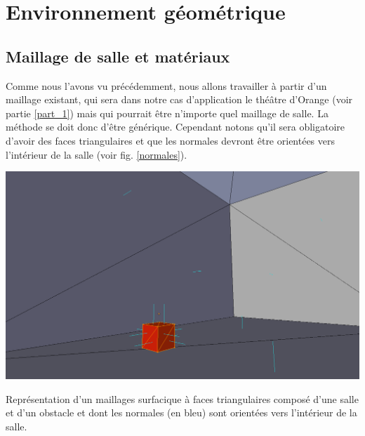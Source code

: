 \section{Environnement géométrique}

\subsection{Maillage de salle et matériaux} \label{sect_lectMat}

Comme nous l'avons vu précédemment, nous allons travailler à partir d'un maillage existant, qui sera dans notre cas d'application le théâtre d'Orange (voir partie \ref{part_1}) mais qui pourrait être n'importe quel maillage de salle. La méthode se doit donc d'être générique. Cependant notons qu'il sera obligatoire d'avoir des faces triangulaires et que les normales devront être orientées vers l'intérieur de la salle (voir fig. \ref{normales}).

\begin{figureth}
	\includegraphics[width=0.8\linewidth]{images/normales}
	\caption{Représentation d'un maillages surfacique à faces triangulaires composé d'une salle et d'un obstacle et dont les normales (en bleu) sont orientées vers l'intérieur de la salle.}
	\label{normales}
\end{figureth}

